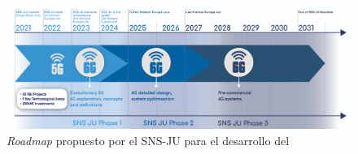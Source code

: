 \begin{figure}[ht]
    \centering
    \includegraphics[width=\textwidth]{archivos/img/intro/banner-screen-1.png}
    \caption{\textit{Roadmap} propuesto por el SNS-JU para el desarrollo del  \cite{eu6gSNS}}
    \label{fig:intro_banner_screen}
\end{figure}


